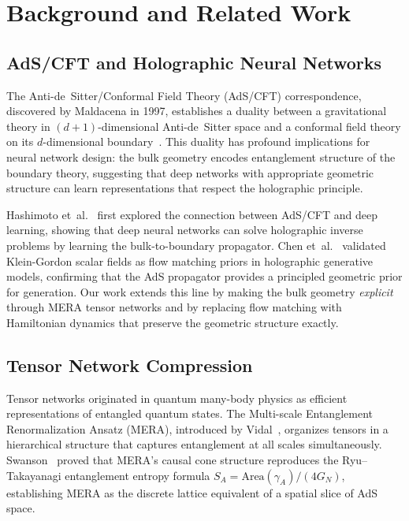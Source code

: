 \documentclass[11pt,a4paper,twocolumn]{article}
\begin{document}
\section{Background and Related Work}

\subsection{AdS/CFT and Holographic Neural Networks}

The Anti-de~Sitter/Conformal Field Theory (AdS/CFT) correspondence, discovered by Maldacena in 1997, establishes a duality between a gravitational theory in $(d+1)$-dimensional Anti-de~Sitter space and a conformal field theory on its $d$-dimensional boundary~\cite{hashimoto2018}.
This duality has profound implications for neural network design: the bulk geometry encodes entanglement structure of the boundary theory, suggesting that deep networks with appropriate geometric structure can learn representations that respect the holographic principle.

Hashimoto et~al.~\cite{hashimoto2018} first explored the connection between AdS/CFT and deep learning, showing that deep neural networks can solve holographic inverse problems by learning the bulk-to-boundary propagator.
Chen et~al.~\cite{chen2026holographic} validated Klein-Gordon scalar fields as flow matching priors in holographic generative models, confirming that the AdS propagator provides a principled geometric prior for generation.
Our work extends this line by making the bulk geometry \emph{explicit} through MERA tensor networks and by replacing flow matching with Hamiltonian dynamics that preserve the geometric structure exactly.

\subsection{Tensor Network Compression}

Tensor networks originated in quantum many-body physics as efficient representations of entangled quantum states.
The Multi-scale Entanglement Renormalization Ansatz (MERA), introduced by Vidal~\cite{vidal2007}, organizes tensors in a hierarchical structure that captures entanglement at all scales simultaneously.
Swanson~\cite{swanson2014} proved that MERA's causal cone structure reproduces the Ryu--Takayanagi entanglement entropy formula $S_A = \mathrm{Area}(\gamma_A)/(4G_N)$, establishing MERA as the discrete lattice equivalent of a spatial slice of AdS space.
\end{document}
